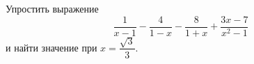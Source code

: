 Упростить выражение $$\dfrac{1}{x-1}-\dfrac{4}{1-x}-\dfrac{8}{1+x}+\dfrac{3x-7}{x^2-1}$$ и найти значение при $x=\dfrac{\sqrt{3}}{3}$.
